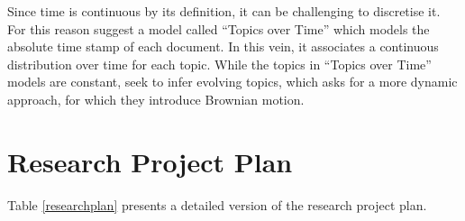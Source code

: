 Since time is continuous by its definition, it can be challenging to discretise it. For this reason \citet{wangtopics2006} suggest a model called ``Topics over Time'' which models the absolute time stamp of each document. In this vein, it associates a continuous distribution over time for each topic. While the topics in ``Topics over Time'' models are constant, \citet{wangcontinuous2012} seek to infer evolving topics, which asks for a more dynamic approach, for which they introduce Brownian motion. 

\section{Research Project Plan}
Table \ref{researchplan} presents a detailed version of the research project plan.
\begin{table}
\centering
{}
\end{table}
